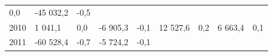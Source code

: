 \begin{longtable}[]{@{}lllllllll@{}}
\begin{minipage}[t]{0.06\columnwidth}
0,0\strut
\end{minipage} & \begin{minipage}[t]{0.09\columnwidth}\raggedright
-45 032,2\strut
\end{minipage} & \begin{minipage}[t]{0.06\columnwidth}\raggedright
-0,5\strut
\end{minipage}\tabularnewline
\begin{minipage}[t]{0.05\columnwidth}\raggedright
2010\strut
\end{minipage} & \begin{minipage}[t]{0.10\columnwidth}\raggedright
1 041,1\strut
\end{minipage} & \begin{minipage}[t]{0.06\columnwidth}\raggedright
0,0\strut
\end{minipage} & \begin{minipage}[t]{0.16\columnwidth}\raggedright
-6 905,3\strut
\end{minipage} & \begin{minipage}[t]{0.06\columnwidth}\raggedright
-0,1\strut
\end{minipage} & \begin{minipage}[t]{0.12\columnwidth}\raggedright
12 527,6\strut
\end{minipage} & \begin{minipage}[t]{0.06\columnwidth}\raggedright
0,2\strut
\end{minipage} & \begin{minipage}[t]{0.09\columnwidth}\raggedright
6 663,4\strut
\end{minipage} & \begin{minipage}[t]{0.06\columnwidth}\raggedright
0,1\strut
\end{minipage}\tabularnewline
\begin{minipage}[t]{0.05\columnwidth}\raggedright
2011\strut
\end{minipage} & \begin{minipage}[t]{0.10\columnwidth}\raggedright
-60 528,4\strut
\end{minipage} & \begin{minipage}[t]{0.06\columnwidth}\raggedright
-0,7\strut
\end{minipage} & \begin{minipage}[t]{0.16\columnwidth}\raggedright
-5 724,2\strut
\end{minipage} & \begin{minipage}[t]{0.06\columnwidth}\raggedright
-0,1\strut
\end{minipage} & \begin{minipage}[t]{0.12\columnwidth}\raggedright

\end{minipage}
\end{longtable}
